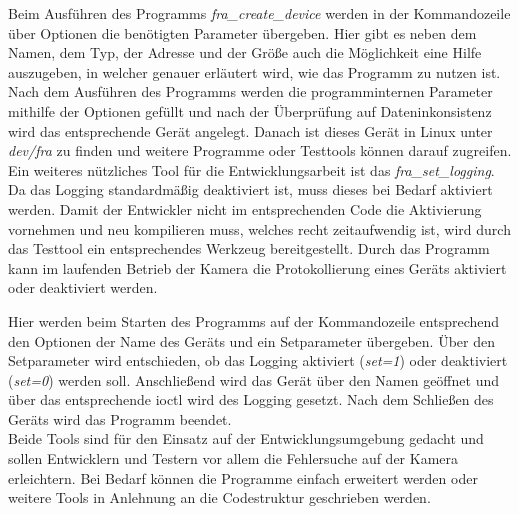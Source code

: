 Beim Ausführen des Programms \textit{fra\_create\_device} werden in der Kommandozeile über Optionen die benötigten Parameter übergeben. Hier gibt es neben dem Namen, dem Typ, der Adresse und der Größe auch die Möglichkeit eine Hilfe auszugeben, in welcher genauer erläutert wird, wie das Programm zu nutzen ist. 
Nach dem Ausführen des Programms werden die programminternen Parameter mithilfe der Optionen gefüllt und nach der Überprüfung auf Dateninkonsistenz wird das entsprechende Gerät angelegt. 
Danach ist dieses Gerät in Linux unter \textit{dev/fra} zu finden und weitere Programme oder Testtools können darauf zugreifen.\\

Ein weiteres nützliches Tool für die Entwicklungsarbeit ist das \textit{fra\_set\_logging}. Da das Logging standardmäßig deaktiviert ist, muss dieses bei Bedarf aktiviert werden. Damit der Entwickler nicht im entsprechenden Code die Aktivierung vornehmen und neu kompilieren muss, welches recht zeitaufwendig ist, wird durch das Testtool ein entsprechendes Werkzeug bereitgestellt. Durch das Programm kann im laufenden Betrieb der Kamera die Protokollierung eines Geräts aktiviert oder deaktiviert werden.


Hier werden beim Starten des Programms auf der Kommandozeile entsprechend den Optionen der Name des Geräts und ein Setparameter übergeben. 
Über den Setparameter wird entschieden, ob das Logging aktiviert (\textit{set=1}) oder deaktiviert (\textit{set=0}) werden soll. Anschließend wird das Gerät über den Namen geöffnet und über das entsprechende \ac{ioctl} wird des Logging gesetzt. Nach dem Schließen des Geräts wird das Programm beendet. \\


Beide Tools sind für den Einsatz auf der Entwicklungsumgebung gedacht und sollen Entwicklern und Testern vor allem die Fehlersuche auf der Kamera erleichtern. Bei Bedarf können die Programme einfach erweitert werden oder weitere Tools in Anlehnung an die Codestruktur geschrieben werden. 